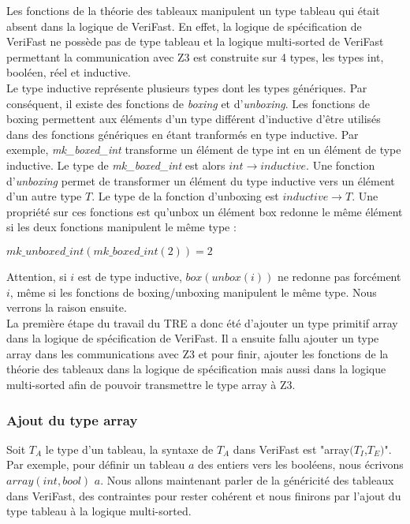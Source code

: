 \documentclass[11pt,openany]{article}
\newcommand{\verifast}{VeriFast}
\begin{document}
	Les fonctions de la th\'eorie des tableaux manipulent un type tableau qui \'etait absent dans la logique de \verifast{}. En effet, la logique de sp\'ecification de \verifast{} ne poss\`ede pas de type tableau et la logique multi-sorted de \verifast{} permettant la communication avec Z3 est construite sur 4 types, les types int, bool\'een, r\'eel et inductive.\\
	Le type inductive repr\'esente plusieurs types dont les types g\'en\'eriques. Par cons\'equent, il existe des fonctions de \textit{boxing} et d'\textit{unboxing}. Les fonctions de boxing permettent aux \'el\'ements d'un type diff\'erent d'inductive d'\^etre utilis\'es dans des fonctions g\'en\'eriques en \'etant tranform\'es en type inductive. Par exemple, \textit{mk_boxed_int} transforme un \'el\'ement de type int en un \'el\'ement de type inductive. Le type de \textit{mk_boxed_int} est alors $int \rightarrow inductive$. Une fonction d'\textit{unboxing} permet de transformer un \'el\'ement du type inductive vers un \'el\'ement d'un autre type $T$. Le type de la fonction d'unboxing est $inductive \rightarrow T$. Une propri\'et\'e sur ces fonctions est qu'unbox un \'el\'ement box redonne le m\^eme \'el\'ement si les deux fonctions manipulent le m\^eme type :
	\begin{center}
		$mk\_unboxed\_int(mk\_boxed\_int(2)) = 2$
	\end{center}
	Attention, si $i$ est de type inductive, $box(unbox(i))$ ne redonne pas forc\'ement $i$, m\^eme si les fonctions de boxing/unboxing manipulent le m\^eme type. Nous verrons la raison ensuite.\\ 
	La premi\`ere \'etape du travail du TRE a donc \'et\'e d'ajouter un type primitif array dans la logique de sp\'ecification de \verifast{}. Il a ensuite fallu ajouter un type array dans les communications avec Z3 et pour finir, ajouter les fonctions de la th\'eorie des tableaux dans la logique de sp\'ecification mais aussi dans la logique multi-sorted afin de pouvoir transmettre le type array \`a Z3.
		\subsubsection{Ajout du type array}
		Soit $T_{A}$ le type d'un tableau, la syntaxe de $T_{A}$ dans \verifast{} est "array$(T_I$,$T_E)$". Par exemple, pour d\'efinir un tableau $a$ des entiers vers les bool\'eens, nous \'ecrivons $array(int,bool)$ $a$. Nous allons maintenant parler de la g\'en\'ericit\'e des tableaux dans \verifast{}, des contraintes pour rester coh\'erent et nous finirons par l'ajout du type tableau \`a la logique multi-sorted.
\end{document}
